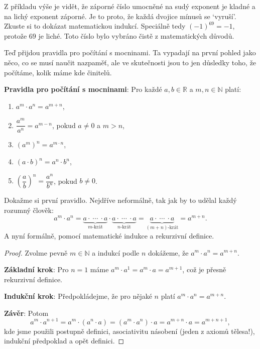 \begin{note}
  Z příkladu výše je vidět, že záporné číslo umocněné na sudý exponent je kladné a na lichý exponent záporné. Je to proto, že každá dvojice mínusů se `vyruší'. Zkuste si to dokázat matematickou indukcí. Speciálně tedy ${(-1)}^{69} = -1$, protože $69$ je liché. Toto číslo bylo vybráno čistě z matematických důvodů.
\end{note}

Teď přijdou pravidla pro počítání s mocninami. Ta vypadají na první pohled jako něco, co se musí naučit nazpaměť, ale ve skutečnosti jsou to jen důsledky toho, že počítáme, kolik máme kde činitelů.

\begin{definitionbox}
  \textbf{Pravidla pro počítání s mocninami}: Pro každé $a, b\in\mathbb{R}$ a $m, n\in\mathbb{N}$ platí:
  \begin{enumerate}
    \item $a^m\cdot a^n = a^{m+n}$,
    \item $\dfrac{a^m}{a^n} = a^{m-n}$, pokud $a\neq 0$ a $m > n$,
    \item ${(a^m)}^n = a^{m\cdot n}$,
    \item ${(a\cdot b)}^n = a^n\cdot b^n$,
    \item ${\left(\dfrac{a}{b}\right)}^n = \dfrac{a^n}{b^n}$, pokud $b\neq 0$.
  \end{enumerate}
\end{definitionbox}

\begin{example}\label{ex:mocniny-soucin}
  Dokažme si první pravidlo. Nejdříve neformálně, tak jak by to udělal každý rozumný člověk:
  \begin{equation*}
    a^m\cdot a^n = \underbrace{a\cdot\ \cdots\ \cdot a}_{m\text{-krát}}\cdot\underbrace{a\cdot\ \cdots\ \cdot a}_{n\text{-krát}} = \underbrace{a\cdot\ \cdots\ \cdot a}_{(m+n)\text{-krát}} = a^{m+n}.
  \end{equation*}
  A nyní formálně, pomocí matematické indukce a rekurzivní definice.

  \begin{proof}
    Zvolme pevně $m\in\mathbb{N}$ a indukcí podle $n$ dokážeme, že $a^m\cdot a^n = a^{m+n}$.

    \textbf{Základní krok}: Pro $n = 1$ máme $a^m\cdot a^1 = a^m\cdot a = a^{m+1}$, což je přesně rekurzivní definice.

    \textbf{Indukční krok}: Předpokládejme, že pro nějaké $n$ platí $a^m\cdot a^n = a^{m+n}$.

    \textbf{Závěr}: Potom
    \begin{equation*}
      a^m\cdot a^{n+1} = a^m\cdot(a^n\cdot a) = (a^m\cdot a^n)\cdot a = a^{m+n}\cdot a = a^{m+n+1},
    \end{equation*}
    kde jsme použili postupně definici, asociativitu násobení (jeden z axiomů tělesa!), indukční předpoklad a opět definici.
  \end{proof}
\end{example}

